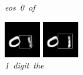 \documentclass{article} %
\begin{document}
\begin{figure}[t]
  \caption{\mbox{\textit{eos 0 of}}}
\endminipage\hfill
{}
  \includegraphics[width=\linewidth]{figures/1-0-17.png}
  \caption{\mbox{\textit{1 digit the}}}
\endminipage\hfill
{}
  \includegraphics[width=\linewidth]{figures/1-0-22.png}

\end{figure}
\end{document}

